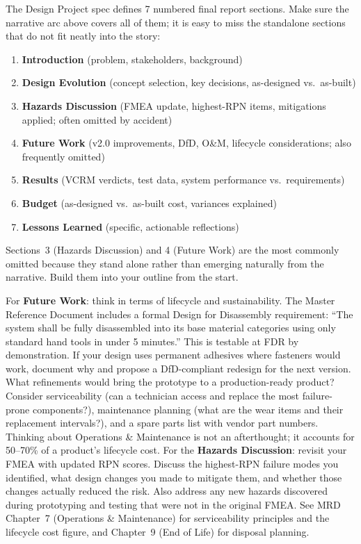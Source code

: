 \begin{tipbox}
The Design Project spec defines 7 numbered final report sections. Make sure the narrative arc above covers all of them; it is easy to miss the standalone sections that do not fit neatly into the story:
\begin{enumerate}[nosep,leftmargin=1.5em]
\item \textbf{Introduction} (problem, stakeholders, background)
\item \textbf{Design Evolution} (concept selection, key decisions, as-designed vs.\ as-built)
\item \textbf{Hazards Discussion} (FMEA update, highest-RPN items, mitigations applied; often omitted by accident)
\item \textbf{Future Work} (v2.0 improvements, DfD, O\&M, lifecycle considerations; also frequently omitted)
\item \textbf{Results} (VCRM verdicts, test data, system performance vs.\ requirements)
\item \textbf{Budget} (as-designed vs.\ as-built cost, variances explained)
\item \textbf{Lessons Learned} (specific, actionable reflections)
\end{enumerate}
Sections~3 (Hazards Discussion) and 4 (Future Work) are the most commonly omitted because they stand alone rather than emerging naturally from the narrative. Build them into your outline from the start.
\end{tipbox}

\begin{faqbox}
For \textbf{Future Work}: think in terms of lifecycle and sustainability. The Master Reference Document includes a formal Design for Disassembly requirement: ``The system shall be fully disassembled into its base material categories using only standard hand tools in under 5 minutes.'' This is testable at FDR by demonstration. If your design uses permanent adhesives where fasteners would work, document why and propose a DfD-compliant redesign for the next version. What refinements would bring the prototype to a production-ready product? Consider serviceability (can a technician access and replace the most failure-prone components?), maintenance planning (what are the wear items and their replacement intervals?), and a spare parts list with vendor part numbers. Thinking about Operations \& Maintenance is not an afterthought; it accounts for 50--70\% of a product's lifecycle cost. For the \textbf{Hazards Discussion}: revisit your FMEA with updated RPN scores. Discuss the highest-RPN failure modes you identified, what design changes you made to mitigate them, and whether those changes actually reduced the risk. Also address any new hazards discovered during prototyping and testing that were not in the original FMEA. See MRD Chapter~7 (Operations \& Maintenance) for serviceability principles and the lifecycle cost figure, and Chapter~9 (End of Life) for disposal planning.
\end{faqbox}


